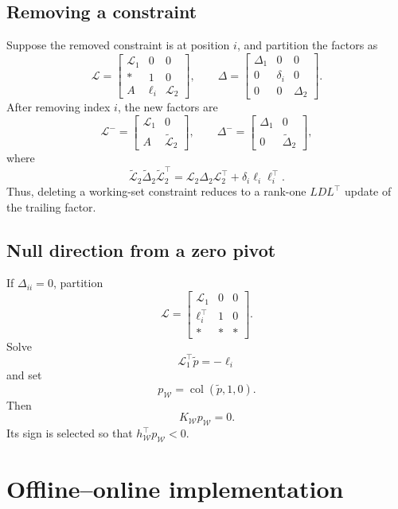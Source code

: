 \documentclass[11pt]{article}
\newcommand{\col}{\operatorname{col}}
\begin{document}
\subsection{Removing a constraint}

Suppose the removed constraint is at position \(i\), and partition
the factors as
\[
\mathscr L=
\begin{bmatrix}
\mathscr L_1&0&0\\
*&1&0\\
A&\ell_i&\mathscr L_2
\end{bmatrix},
\qquad
\Delta=
\begin{bmatrix}
\Delta_1&0&0\\
0&\delta_i&0\\
0&0&\Delta_2
\end{bmatrix}.
\]
After removing index \(i\), the new factors are
\[
\mathscr L^-=
\begin{bmatrix}
\mathscr L_1&0\\
A&\widetilde{\mathscr L}_2
\end{bmatrix},
\qquad
\Delta^-=
\begin{bmatrix}
\Delta_1&0\\
0&\widetilde{\Delta}_2
\end{bmatrix},
\]
where
\begin{equation}
\widetilde{\mathscr L}_2
\widetilde{\Delta}_2
\widetilde{\mathscr L}_2^\top
=
\mathscr L_2\Delta_2\mathscr L_2^\top
+\delta_i\ell_i\ell_i^\top.
\label{eq:ldl-removal}
\end{equation}
Thus, deleting a working-set constraint reduces to a rank-one
\(LDL^\top\) update of the trailing factor.

\subsection{Null direction from a zero pivot}

If \(\Delta_{ii}=0\), partition
\[
\mathscr L=
\begin{bmatrix}
\mathscr L_1&0&0\\
\ell_i^\top&1&0\\
*&*&*
\end{bmatrix}.
\]
Solve
\[
\mathscr L_1^\top\widetilde p=-\ell_i
\]
and set
\[
p_{\mathcal W}
=
\col(\widetilde p,1,0).
\]
Then
\[
K_{\mathcal W}p_{\mathcal W}=0.
\]
Its sign is selected so that
\(h_{\mathcal W}^\top p_{\mathcal W}<0\).

\section{Offline--online implementation}
\end{document}
